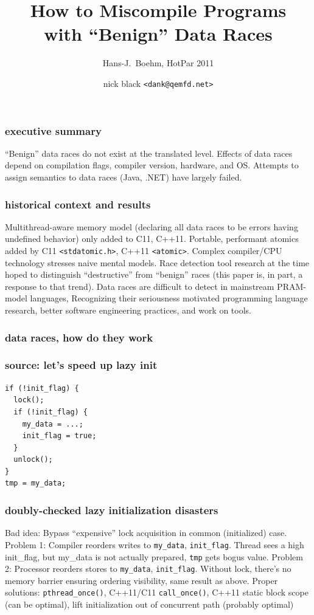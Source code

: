 \documentclass{beamer}
\title{How to Miscompile Programs\\ with ``Benign'' Data Races}
\subtitle{Hans-J.\ Boehm, HotPar 2011}
\author{nick black {\texttt{<dank@qemfd.net>}}}
\institute{Atlanta PWL \#09, 2018-10-09}
\date{}
\begin{document}
\begin{frame}
\titlepage
\end{frame}

\begin{frame}
\frametitle{executive summary}
``Benign'' data races do not exist at the translated level.
\vfill
Effects of data races depend on compilation flags, compiler version, hardware,
and OS.
\vfill
Attempts to assign semantics to data races (Java, .NET) have largely failed.
\end{frame}

\begin{frame}
\frametitle{historical context and results}
Multithread-aware memory model (declaring all data races to be errors having undefined behavior) only added to C11, C++11.
\vfill
Portable, performant atomics added by C11 \texttt{<stdatomic.h>}, C++11 \texttt{<atomic>}.
\vfill
Complex compiler/CPU technology stresses naive mental models.
\vfill
Race detection tool research at the time hoped to distinguish ``destructive'' from ``benign'' races (this paper is, in part, a response to that trend).
\vfill
Data races are difficult to detect in mainstream PRAM-model languages, Recognizing their seriousness motivated programming language research, better software engineering practices, and work on tools.
\end{frame}

\begin{frame}
\frametitle{data races, how do they work}
\end{frame}

\begin{frame}[fragile]
\frametitle{source: let's speed up lazy init}
\begin{lstlisting}
if (!init_flag) {
  lock();
  if (!init_flag) {
    my_data = ...;
    init_flag = true;
  }
  unlock();
}
tmp = my_data;
\end{lstlisting}
\end{frame}

\begin{frame}
\frametitle{doubly-checked lazy initialization disasters}
Bad idea: Bypass ``expensive'' lock acquisition in common (initialized) case.
\vfill
Problem 1: Compiler reorders writes to \texttt{my\_data}, \texttt{init\_flag}. Thread sees a high init\_flag, but my\_data is not actually prepared, \texttt{tmp} gets bogus value.
\vfill
Problem 2: Processor reorders stores to \texttt{my\_data}, \texttt{init\_flag}. Without lock, there's no memory barrier ensuring ordering visibility, same result as above.
\vfill
Proper solutions: {\texttt{pthread\_once()}}, C++11/C11 \texttt{call\_once()}, C++11 static block scope (can be optimal), lift initialization out of concurrent path (probably optimal)
\end{frame}
\end{document}

